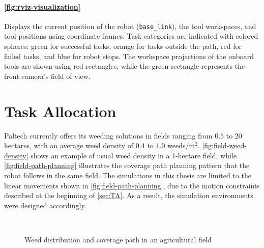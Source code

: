 \paragraph{\autoref{fig:rviz-visualization}} Displays the current position of the robot (\texttt{base\_link}), the tool workspaces, and tool positions using coordinate frames. Task categories are indicated with colored spheres: green for successful tasks, orange for tasks outside the path, red for failed tasks, and blue for robot stops. The workspace projections of the onboard tools are shown using red rectangles, while the green rectangle represents the front camera’s field of view.

\section{Task Allocation}
Paltech currently offers its weeding solutions in fields ranging from $0.5$ to $20$ hectares, with an average weed density of $0.4$ to $1.0$ weeds/m$^2$. \autoref{fig:field-weed-density} shows an example of usual weed density in a 1-hectare field, while \autoref{fig:field-path-planning} illustrates the coverage path planning pattern that the robot follows in the same field. The simulations in this thesis are limited to the linear movements shown in \ref{fig:field-path-planning}, due to the motion constraints described at the beginning of \autoref{sec:TA}. As a result, the simulation environments were designed accordingly.

\begin{figure}[htb]
    \myfloatalign
     \quad
     \\
    \caption{Weed distribution and coverage path in an agricultural field}\label{fig:usual-field-example}
\end{figure}

